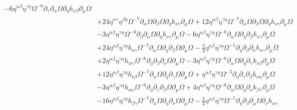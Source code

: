 \documentclass[10pt,letterpaper]{article}
\begin{document}
\begin{align}
 - 6 \eta^{\alpha \beta} \eta^{\gamma \eta} \Omega^{-6} \partial_{\gamma}\partial_{\alpha}\Omega \partial_{\eta}h_{\nu \beta} \partial_{\mu}\Omega\nonumber\\
& + 24 \eta^{\alpha \gamma} \eta^{\beta \eta} \Omega^{-7} \partial_{\alpha}\Omega \partial_{\beta}\Omega \partial_{\eta}h_{\nu \gamma} \partial_{\mu}\Omega
 + 12 \eta^{\alpha \beta} \eta^{\gamma \eta} \Omega^{-7} \partial_{\alpha}\Omega \partial_{\beta}\Omega \partial_{\eta}h_{\nu \gamma} \partial_{\mu}\Omega\nonumber\\
& - 3 \eta^{\alpha \beta} \eta^{\gamma \eta} \Omega^{-6} \partial_{\beta}\partial_{\alpha}\Omega \partial_{\eta}h_{\nu \gamma} \partial_{\mu}\Omega
 - 6 \eta^{\alpha \beta} \eta^{\gamma \eta} \Omega^{-6} \partial_{\alpha}\Omega \partial_{\eta}\partial_{\beta}h_{\nu \gamma} \partial_{\mu}\Omega\nonumber\\
& + 24 \eta^{\alpha \beta} \eta^{\gamma \eta} h_{\nu \gamma} \Omega^{-7} \partial_{\alpha}\Omega \partial_{\eta}\partial_{\beta}\Omega \partial_{\mu}\Omega
 -  \tfrac{2}{3} \eta^{\alpha \beta} \eta^{\gamma \eta} \Omega^{-5} \partial_{\eta}\partial_{\beta}\partial_{\nu}h_{\alpha \gamma} \partial_{\mu}\Omega\nonumber\\
& + 2 \eta^{\alpha \beta} \eta^{\gamma \eta} h_{\alpha \gamma} \Omega^{-6} \partial_{\eta}\partial_{\beta}\partial_{\nu}\Omega \partial_{\mu}\Omega
 - 3 \eta^{\alpha \beta} \eta^{\gamma \eta} \Omega^{-6} \partial_{\alpha}\Omega \partial_{\eta}\partial_{\gamma}h_{\nu \beta} \partial_{\mu}\Omega\nonumber\\
& + 12 \eta^{\alpha \beta} \eta^{\gamma \eta} h_{\nu \beta} \Omega^{-7} \partial_{\alpha}\Omega \partial_{\eta}\partial_{\gamma}\Omega \partial_{\mu}\Omega
 + \eta^{\alpha \beta} \eta^{\gamma \eta} \Omega^{-5} \partial_{\eta}\partial_{\gamma}\partial_{\beta}h_{\nu \alpha} \partial_{\mu}\Omega\nonumber\\
& - 3 \eta^{\alpha \beta} \eta^{\gamma \eta} h_{\nu \alpha} \Omega^{-6} \partial_{\eta}\partial_{\gamma}\partial_{\beta}\Omega \partial_{\mu}\Omega
 + 4 \eta^{\alpha \beta} \eta^{\gamma \eta} \Omega^{-6} \partial_{\alpha}\Omega \partial_{\eta}\partial_{\nu}h_{\beta \gamma} \partial_{\mu}\Omega\nonumber\\
& - 16 \eta^{\alpha \beta} \eta^{\gamma \eta} h_{\beta \gamma} \Omega^{-7} \partial_{\alpha}\Omega \partial_{\eta}\partial_{\nu}\Omega \partial_{\mu}\Omega
 -  \tfrac{2}{3} \eta^{\alpha \beta} \eta^{\gamma \eta} \Omega^{-5} \partial_{\eta}\partial_{\beta}\partial_{\mu}\Omega \partial_{\nu}h_{\alpha \gamma}\nonumber\\

\end{align}
\end{document}
